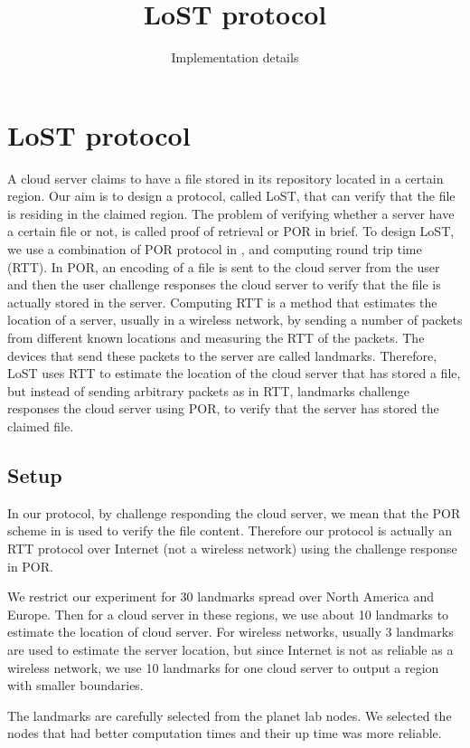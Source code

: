 \documentclass[12pt]{article}
\title{LoST protocol}
\author{Implementation details}
\begin{document}
\maketitle

\section{LoST protocol}
A cloud server claims to have a file stored in its repository located in a certain region. 
Our aim is to design a protocol, called LoST, that can verify that the file is residing in the 
claimed region. The problem of verifying whether a server have a certain file or not, 
is called proof of retrieval or POR in brief.
To design LoST, we use a combination of POR protocol in \cite{POR}, and computing round trip time (RTT).
In POR, an encoding of a file is sent to the cloud server from the user and then the user 
challenge responses the cloud server to verify that the file is actually stored in the server. 
Computing RTT is a method that estimates the location of a server, usually in a wireless network, by 
sending a number of packets from different known locations and measuring the RTT of 
the packets. The devices that send these packets to the server are called landmarks.
Therefore, LoST uses RTT to estimate the location of the cloud server that has stored a 
file, but instead of sending arbitrary packets as in RTT, landmarks challenge responses the cloud server 
using POR, to verify that the server has stored the claimed file. 

\subsection{Setup}
In our protocol, by challenge responding the cloud server, we mean that the 
POR scheme in \cite{POR} is used to verify the file content. Therefore our 
protocol is actually an RTT protocol over Internet (not a wireless network) 
using the challenge response in POR. 

We restrict our experiment for 30 landmarks spread over North America and Europe. 
Then for a cloud server in these regions, we use about 10 landmarks to estimate the 
location of cloud server. For wireless networks, usually 3 landmarks are used to estimate 
the server location, but since Internet is not as reliable as a wireless network, we use 
10 landmarks for one cloud server to output a region with smaller boundaries. 

The landmarks are carefully selected from the planet lab nodes. We selected the nodes that 
had better computation times and their up time was more reliable. 
\end{document}
